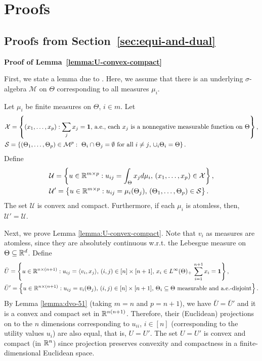 
\section{Proofs} \label{app:proofs}

\subsection{Proofs from Section~\ref{sec:equi-and-dual}}
	\smallskip\noindent\textbf{Proof of Lemma~\ref{lemma:U-convex-compact}}

	First, we state a lemma due to \citet[Theorems 1 and 4]{dvoretzky1951relations}. Here, we assume that there is an underlying $\sigma$-algebra $\mathcal{M}$ on $\Theta$ corresponding to all measures $\mu_i$.
	\begin{lemma}
		Let $\mu_i$ be finite measures on $\Theta$, $i\in m$. 
		Let 
		\begin{align*}
			& \mathcal{X} = \left\{ (x_1, \dots, x_p): \sum_j x_j = \mathbf{1}, \, \textnormal{a.e.},\, \text{each $x_j$ is a nonnegative measurable function on $\Theta$} \right\}, \\
			& \mathcal{S} = \left\{ (\Theta_1, \dots, \Theta_p) \in \mathcal{M}^p: \text{ $\Theta_i \cap \Theta_j = \emptyset$ for all $i\neq j$, $\cup_i \Theta_i = \Theta$}\right\}.
		\end{align*}
		Define 
		\begin{align*}
			& \mathcal{U} = \left\{ u\in \mathbb{R}^{m\times p}: u_{ij} = \int_{\Theta} x_j d\mu_i,\, (x_1, \dots, x_p)\in\mathcal{X} \right\}, \\
			& \mathcal{U}' = \left\{ u\in \mathbb{R}^{m\times p}: u_{ij} = \mu_i(\Theta_j),\, (\Theta_1, \dots, \Theta_p) \in \mathcal{S} \right\}.
		\end{align*}
		The set $\mathcal{U}$ is convex and compact. Furthermore, if each $\mu_i$ is atomless, then, $\mathcal{U}' = \mathcal{U}$.
		\label{lemma:dvo-51}
	\end{lemma}

	Next, we prove Lemma \ref{lemma:U-convex-compact}.
	Note that $v_i$ as measures are atomless, since they are absolutely continuous w.r.t. the Lebesgue measure on $\Theta\subseteq \mathbb{R}^d$.
	Define 
	\begin{align*}
		& \bar{U} = \left\{ u \in \mathbb{R}^{n\times (n+1)}: u_{ij} = \langle v_i, x_j\rangle,\, (i,j)\in [n]\times [n+1],\, x_i \in L^\infty(\Theta)_+\, \sum_{i=1}^{n+1} x_i = \mathbf{1} \right\}, \\ 
		& \bar{U}' = \left\{ u \in \mathbb{R}^{n\times (n+1)}: u_{ij} = v_i(\Theta_j),\, (i,j)\in [n]\times [n+1],\, \textnormal{$\Theta_i\subseteq \Theta$ measurable and a.e.-disjoint}\right\}.
	\end{align*}
	By Lemma \ref{lemma:dvo-51} (taking $m=n$ and $p=n+1$), we have $\bar{U} = \bar{U}'$
	and it is a convex and compact set in $\mathbb{R}^{n(n+1)}$.
	Therefore, their (Euclidean) projections on to the $n$ dimensions corresponding to $u_{ii}$, $i\in [n]$ (corresponding to the utility values $u_i$) are also equal, that is, 
	$U = U'$.
	The set $U=U'$ is convex and compact (in $\mathbb{R}^n$) since projection preserves convexity and compactness in a finite-dimensional Euclidean space.

